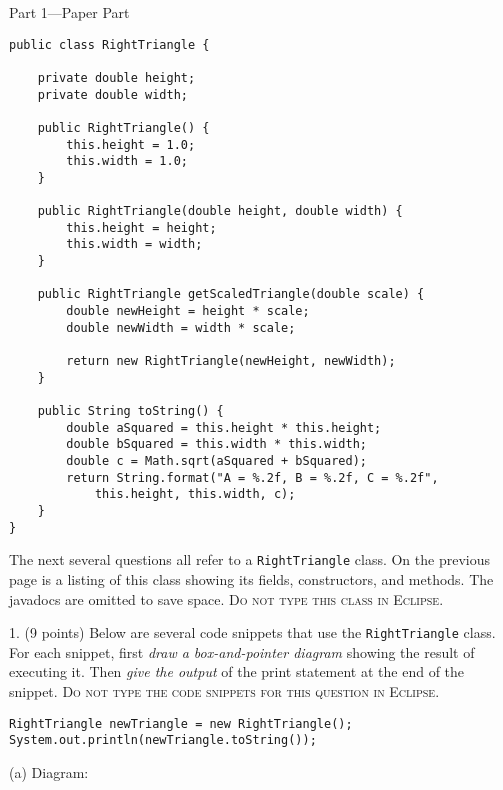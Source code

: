 \documentclass[12pt,twoside]{article}
\newcommand{\code}[1]{\texttt{#1}}
\begin{document}
{\Large Part 1---Paper Part}

\begin{center}
\begin{minipage}[t]{0.9\linewidth}
\begin{lstlisting}
public class RightTriangle {

	private double height;
	private double width;
	
	public RightTriangle() {
		this.height = 1.0;
		this.width = 1.0;
	}
	
	public RightTriangle(double height, double width) {
		this.height = height;
		this.width = width;
	}
	
	public RightTriangle getScaledTriangle(double scale) {
		double newHeight = height * scale;
		double newWidth = width * scale;
		
		return new RightTriangle(newHeight, newWidth);
	}
	
	public String toString() {
		double aSquared = this.height * this.height;
		double bSquared = this.width * this.width;
		double c = Math.sqrt(aSquared + bSquared);
		return String.format("A = %.2f, B = %.2f, C = %.2f", 
			this.height, this.width, c);
	}
}
\end{lstlisting}
\end{minipage}
\end{center}
\clearpage

The next several questions all refer to a \code{RightTriangle} class.  On the previous page is a listing of this class showing its fields, constructors, and methods.  The javadocs are omitted to save space. \textsc{Do not type this class in Eclipse}.

1. (9 points) Below are several code snippets that use the \code{RightTriangle} class.  For each snippet, first 
\emph{draw a box-and-pointer diagram} showing the result of executing it.  Then \emph{give the output} of the print statement at the end of the snippet. \textsc{Do not type the code snippets for this question in Eclipse}.

\begin{minipage}[t]{0.55\linewidth}
\begin{lstlisting}
RightTriangle newTriangle = new RightTriangle();
System.out.println(newTriangle.toString());
\end{lstlisting}
\end{minipage}
\hspace{0.25in}
\begin{minipage}[t]{0.3\linewidth}
\vspace{0.05in}
(a) Diagram: 
\end{minipage}
\end{document}

